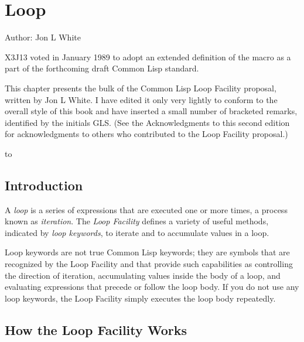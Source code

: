 
\clearpage\def\pagestatus{FINAL PROOF}

\chapter{Loop}
\label{LOOP}

Author: Jon L White

\begin{new}
\prefaceword
X3J13 voted in January 1989
to adopt an extended definition of the  macro
as a part of the forthcoming draft Common Lisp standard.

This chapter presents the bulk of the Common Lisp
Loop Facility proposal, written by Jon L White.  I have
edited it only very lightly
to conform to the overall style of this book and have inserted a small
number of bracketed remarks, identified by the initials GLS.
(See the Acknowledgments to this second edition for
acknowledgments to others who contributed to the Loop Facility proposal.)

\noindent\hbox to \textwidth{\hss---Guy L. Steele Jr.}

\section{Introduction}

A {\it loop\/} is a series of expressions that are executed one or more times,
a process known as {\it iteration}.
The {\it Loop Facility\/} defines a
variety of useful methods, indicated by
{\it loop keywords}, to iterate and to
accumulate values in a loop.


Loop keywords are not true Common Lisp keywords; they are symbols that
are recognized by the Loop Facility and that provide such capabilities
as controlling the direction of iteration, accumulating values inside
the body of a loop, and evaluating expressions that precede or follow
the loop body.  If you do not use any loop keywords, the Loop Facility
simply executes the loop body repeatedly.


\section{How the Loop Facility Works}


\end{new}
